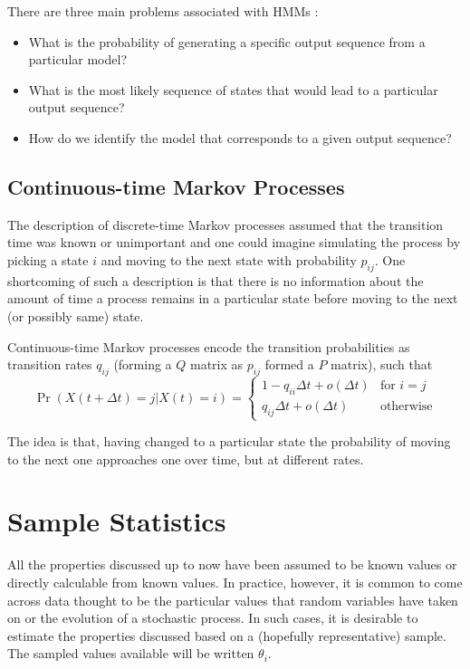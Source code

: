 There are three main problems associated with HMMs \citep{gamerman.lopes2006markov}:
\begin{itemize}
\item What is the probability of generating a specific output sequence
  from a particular model?
\item What is the most likely sequence of states that would lead to a
  particular output sequence?
\item How do we identify the model that corresponds to a given output
  sequence?
\end{itemize}

\subsection{Continuous-time Markov Processes}
The description of discrete-time Markov processes assumed that the
transition time was known or unimportant and one could imagine
simulating the process by picking a state $i$ and moving to the next
state with probability $p_{ij}$.  One shortcoming of such a
description is that there is no information about the amount of time a
process remains in a particular state before moving to the next (or
possibly same) state.  

Continuous-time Markov processes encode the transition probabilities as
transition rates $q_{ij}$ (forming a $Q$ matrix as $p_{ij}$ formed a
$P$ matrix), such that
\begin{equation}
  \label{eq:contmarkov}
  \Pr(X(t+\Delta t) = j | X(t) = i) = 
  \begin{cases}
    1 - q_{ii}\Delta t + o(\Delta t) & \text{for } i = j \\
    q_{ij}\Delta t + o(\Delta t) & \text{otherwise}
  \end{cases}
\end{equation}

The idea is that, having changed to a particular state the probability of moving to the next one approaches one over time, but at different rates.



\section{Sample Statistics}
All the properties discussed up to now have been assumed to be known values or directly calculable from known values.
In practice, however, it is common to come across data thought to be the particular values that random variables have taken on or the evolution of a stochastic process.
In such cases, it is desirable to estimate the properties discussed based on a (hopefully representative) sample.
The sampled values available will be written $\theta_i$.

